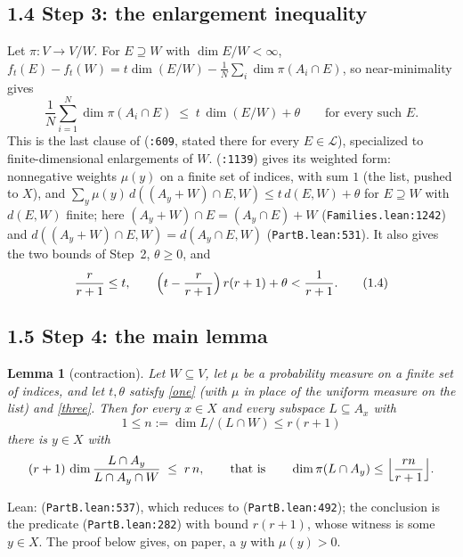 \documentclass[11pt]{amsart}
\newtheorem*{lemma*}{Lemma}
\newcommand{\Lc}{\mathcal{L}}
\begin{document}
\subsection*{1.4 Step 3: the enlargement inequality}
Let $\pi:V\to V/W$. For $E\supseteq W$ with $\dim E/W<\infty$,
$f_t(E)-f_t(W)=t\dim(E/W)-\frac1N\sum_i\dim\pi(A_i\cap E)$, so near-minimality gives
\begin{equation}\label{one}
\frac1N\sum_{i=1}^N\dim\pi(A_i\cap E)\;\le\;t\,\dim(E/W)+\theta\qquad\text{for every such }E .\tag{1.3}
\end{equation}
This is the last clause of  (\texttt{:609}, stated there for every $E\in\Lc$),
specialized to finite-dimensional enlargements of $W$.  (\texttt{:1139}) gives its weighted form:
nonnegative weights $\mu(y)$ on a finite set of indices, with sum $1$ (the list, pushed to $X$), and
$\sum_y\mu(y)\,d((A_y+W)\cap E,W)\le t\,d(E,W)+\theta$ for $E\supseteq W$ with $d(E,W)$ finite; here
$(A_y+W)\cap E=(A_y\cap E)+W$ (\texttt{Families.lean:1242}) and $d((A_y+W)\cap E,W)=d(A_y\cap E,W)$
(\texttt{PartB.lean:531}). It also gives the two bounds of Step~2, $\theta\ge0$, and
\begin{equation}\label{three}
\frac r{r+1}\le t,\qquad \Bigl(t-\frac r{r+1}\Bigr)\,r(r+1)+\theta<\frac1{r+1}.\tag{1.4}
\end{equation}

\subsection*{1.5 Step 4: the main lemma}

\begin{lemma*}[contraction]
Let $W\subseteq V$, let $\mu$ be a probability measure on a finite set of indices, and let $t,\theta$ satisfy \eqref{one}
\textup(with $\mu$ in place of the uniform measure on the list\textup) and \eqref{three}. Then for every $x\in X$ and every
subspace $L\subseteq A_x$ with
\[1\le n:=\dim L/(L\cap W)\le r(r+1)\]
there is $y\in X$ with
\[(r+1)\,\dim\frac{L\cap A_y}{L\cap A_y\cap W}\;\le\;r\,n,\qquad\text{that is}\qquad
\dim\pi(L\cap A_y)\le\Bigl\lfloor\frac{rn}{r+1}\Bigr\rfloor .\]
\end{lemma*}

\noindent Lean:  (\texttt{PartB.lean:537}), which reduces to
 (\texttt{PartB.lean:492}); the conclusion is the predicate 
(\texttt{PartB.lean:282}) with bound $r(r+1)$, whose witness is some $y\in X$. The proof below gives, on paper, a $y$ with
$\mu(y)>0$.
\end{document}
